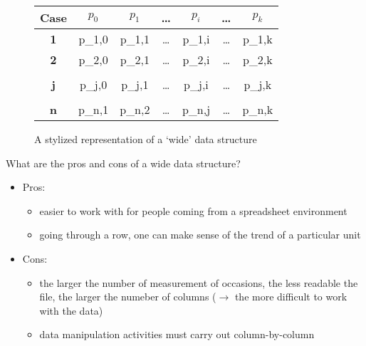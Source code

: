 \documentclass[a4paper,11pt]{book}
\numberwithin{figure}{chapter}
\numberwithin{table}{chapter}
\newcommand{\question}[1]{%
    \begin{tcolorbox}[colback=comp_c!10,colframe=comp_c,sidebyside align=top,width=\linewidth,before skip=1ex]
        #1
    \end{tcolorbox}
    \switchcolumn%
}
\newcommand{\note}[1]{%
    \begin{tcolorbox}[colback=white!0,colframe=white!10,width=\linewidth,before skip=1ex]
        #1
    \end{tcolorbox}
}
\begin{document}
\begin{figure}[!htbp]
	\centering
	\begin{tabular}{|c|c|c|c|c|c|c|}
		\hline
		\textbf{Case} & \textbf{$p_{0}$} & \textbf{$p_{1}$} & \ldots & \textbf{$p_{i}$} & \ldots & \textbf{$p_{k}$} \\ \hline
		\textbf{1}    & p_{1,0} & p_{1,1} & \ldots & p_{1,i} & \ldots & p_{1,k} \\
		\textbf{2}    & p_{2,0} & p_{2,1} & \ldots & p_{2,i} & \ldots & p_{2,k} \\
                \multicolumn{7}{c}{}\\
		\textbf{j}    & p_{j,0} & p_{j,1} & \ldots & p_{j,i} & \ldots & p_{j,k} \\
                \multicolumn{7}{c}{}\\
		\textbf{n}    & p_{n,1} & p_{n,2} & \ldots & p_{n,j} & \ldots & p_{n,k} \\
		\hline 
	\end{tabular}
	\caption{A stylized representation of a `wide' data structure}
	\label{fig:wide_dataframe}
\end{figure}

\begin{paracol}{2}
	\question{
		\raggedright What are the pros and cons of a wide data structure?
	}
	\note{
		\begin{itemize}
			\item Pros:
			\begin{itemize}
				\item easier to work with for people coming from a spreadsheet environment
				\item going through a row, one can make sense of the trend of a particular unit
			\end{itemize}
			\item Cons:
			\begin{itemize}
				\item the larger the number of measurement of occasions, the less readable the file, the larger the numeber of columns ($\rightarrow$ the more difficult to work with the data)
				\item data manipulation activities must carry out column-by-column
			\end{itemize}
		\end{itemize}
		}
\end{paracol}
\end{document}
